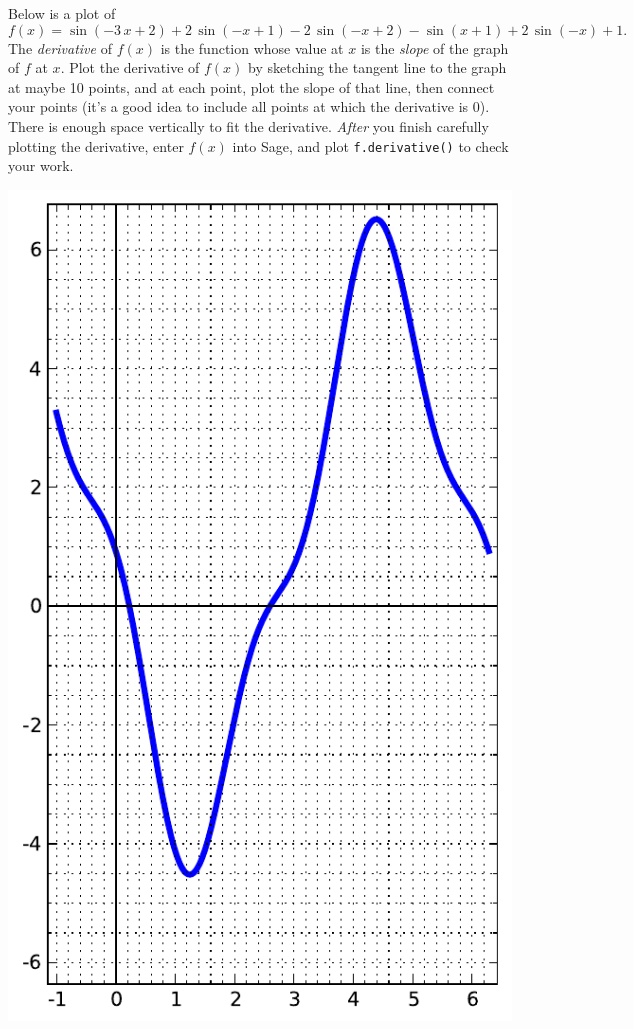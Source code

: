Below is a plot of $$f(x)=\sin\left(-3 \, x + 2\right) + 2 \, \sin\left(-x + 1\right) - 2 \, \sin\left(-x + 2\right) - \sin\left(x + 1\right) + 2 \, \sin\left(-x\right) + 1.$$  The {\em \color{red}derivative} of $f(x)$ is the function whose value at $x$ is the {\em slope} of the graph of $f$ at $x$.  Plot the derivative of $f(x)$ by sketching the tangent line to the graph at maybe 10 points, and at each point, plot the slope of that line, then connect your points (it's a good idea to include all points at which the derivative is 0).  There is enough space vertically to fit the derivative.  {\em After} you finish carefully plotting the derivative, enter $f(x)$ into Sage, and plot {\color{blue}\verb|f.derivative()|} to check your work.
\begin{center}\includegraphics{functions/65.pdf}\end{center}\newpage

